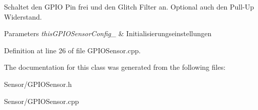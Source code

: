 Schaltet den G\+P\+I\+O Pin frei und den Glitch Filter an. Optional auch den Pull-\/\+Up Widerstand. 


\begin{DoxyParams}{Parameters}
{\em this\+G\+P\+I\+O\+Sensor\+Config\+\_\+} & Initialisierungseinstellungen \\
\hline
\end{DoxyParams}


Definition at line 26 of file G\+P\+I\+O\+Sensor.\+cpp.



The documentation for this class was generated from the following files\+:\begin{DoxyCompactItemize}
\item 
Sensor/G\+P\+I\+O\+Sensor.\+h\item 
Sensor/G\+P\+I\+O\+Sensor.\+cpp\end{DoxyCompactItemize}
